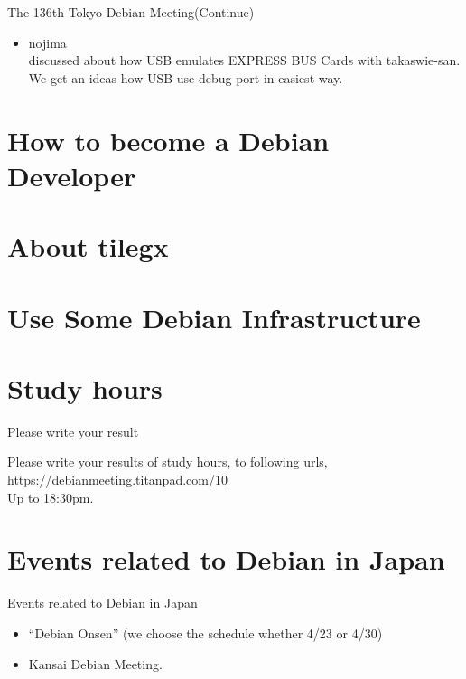 \begin{frame}{The 136th Tokyo Debian Meeting(Continue)}

\begin{itemize}
\item nojima\\
  discussed about how USB emulates EXPRESS BUS Cards with takaswie-san. We get an ideas how USB use debug port in easiest way.
\end{itemize}

\end{frame}

\section{How to become a Debian Developer}

\section{About tilegx}

\section{Use Some Debian Infrastructure}

\section{Study hours}

\begin{frame}{Please write your result}

  Please write your results of study hours, to following urls,
\url{https://debianmeeting.titanpad.com/10}\\
Up to 18:30pm.

\end{frame}
  
\section{Events related to Debian in Japan}

\begin{frame}{Events related to Debian in Japan}

  \begin{itemize}
  \item ``Debian Onsen'' (we choose the schedule whether 4/23 or 4/30)
  \item Kansai Debian Meeting.
  \end{itemize}

\end{frame}

